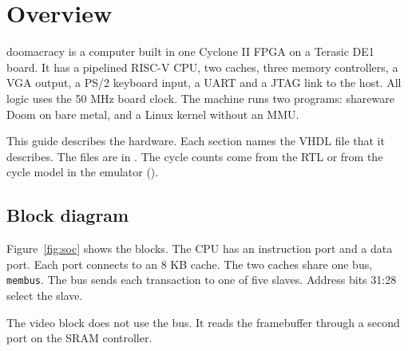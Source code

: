 \section{Overview}
\label{sec:overview}

doomacracy is a computer built in one Cyclone II FPGA on a Terasic DE1 board. It has a pipelined RISC-V CPU, two caches, three memory controllers, a VGA output, a PS/2 keyboard input, a UART and a JTAG link to the host. All logic uses the 50 MHz board clock. The machine runs two programs: shareware Doom on bare metal, and a Linux kernel without an MMU.

This guide describes the hardware. Each section names the VHDL file that it describes. The files are in . The cycle counts come from the RTL or from the cycle model in the emulator ().

\subsection{Block diagram}

Figure~\ref{fig:soc} shows the blocks. The CPU has an instruction port and a data port. Each port connects to an 8 KB cache. The two caches share one bus, \texttt{membus}. The bus sends each transaction to one of five slaves. Address bits 31:28 select the slave.

The video block does not use the bus. It reads the framebuffer through a second port on the SRAM controller.

